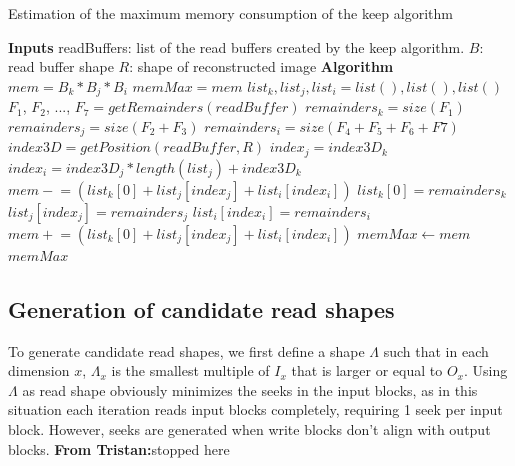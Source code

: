 \documentclass[sigconf, nonacm]{acmart}
\newcommand{\tristan}[1]{\color{orange}\textbf{From Tristan:}#1\color{black}}
\begin{document}
\begin{algorithm}
  \caption{Estimation of the maximum memory consumption of the keep algorithm}
  \label{algo:max_mem_keep_algorithm}
  \begin{algorithmic}[1]
    \STATE \textbf{Inputs}
    \STATE readBuffers: list of the read buffers created by the keep algorithm.
    \STATE $B$: read buffer shape
    \STATE $R$: shape of reconstructed image
    \STATE
    \STATE \textbf{Algorithm}
    \STATE $mem = B_k*B_j*B_i$
    \STATE $memMax = mem$
    \STATE $list_k, list_j, list_i = list(), list(), list()$
    \STATE
      \STATE $F_1$, $F_2$, ..., $F_7= getRemainders(readBuffer)$
      \STATE $remainders_k = size(F_1)$
      \STATE $remainders_j = size(F_2+F_3)$
      \STATE $remainders_i = size(F_4+F_5+F_6+F7)$
      \STATE $index3D = getPosition(readBuffer,R)$
      \STATE
      \STATE $index_j = index3D_k$
      \STATE $index_i = index3D_j*length(list_j) + index3D_k$
      \STATE $mem \mathrel{-}= (list_k[0] + list_j[index_j] + list_i[index_i])$
      \STATE
      \STATE $list_k[0] = remainders_k$
      \STATE $list_j[index_j] = remainders_j$
      \STATE $list_i[index_i] = remainders_i$
      \STATE $mem \mathrel{+}= (list_k[0] + list_j[index_j] + list_i[index_i])$
      \STATE
        \STATE $memMax\leftarrow mem$
      \ENDIF
    \ENDFOR
    \RETURN $memMax$
  \end{algorithmic}
\end{algorithm}


\subsection{Generation of candidate read shapes}

To generate candidate read shapes, we first define a shape $\Lambda$ such
that in each dimension $x$, $\Lambda_x$ is the smallest multiple of $I_x$
that is larger or equal to $O_x$. Using $\Lambda$ as read shape obviously
minimizes the seeks in the input blocks, as in this situation each
iteration reads input blocks completely, requiring 1 seek per input block.
However, seeks are generated when write blocks don't align with output
blocks. \tristan{stopped here}


\end{document}
